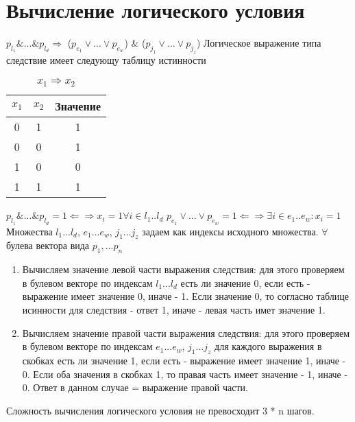 \documentclass[a4paper,12pt]{article}
\begin{document}
\section{Вычисление логического условия}
${p_{l_1} \& ...\& p_{l_d}} \Rightarrow$ (${p_{e_1}\vee ... \vee p_{e_w}}$) $ \& $ (${p_{j_1}\vee ...\vee p_{j_z}}$)
\newline Логическое выражение типа следствие имеет следующу таблицу истинности
\begin{table}[h]
	\caption{$x_1 \Rightarrow x_2$}
	\begin{center}
		\begin{tabular}{|c|c|c|}
			\hline
			$x_1$ & $x_2$ & Значение \\
			\hline
			0 & 1 & 1 \\
			\hline
			0 & 0 & 1 \\
			\hline
			1 & 0 & 0 \\
			\hline
			1 & 1 & 1 \\
			\hline
		\end{tabular}
	\end{center}
\end{table}
\newline ${p_{l_1} \& ...\& p_{l_d}} = 1 \Leftarrow \Rightarrow x_i = 1  \forall i \in {l_1..l_d}$
\newline ${p_{e_1} \vee ...\vee p_{e_w}} = 1 \Leftarrow \Rightarrow \exists i \in {e_1..e_w}: x_i = 1$
\newline Множества ${{l_1}...{l_d}}$, ${{e_1}...{e_w}}$, ${{j_1}...{j_z}}$ задаем как индексы исходного множества.
$\forall $ булева вектора вида $ {p_{1},...p_{n}}$
\begin{enumerate}
\item 
Вычисляем значение левой части выражения следствия: для этого проверяем в булевом векторе по индексам ${{l_1}...{l_d}}$ есть ли значение 0, если есть - выражение имеет значение 0, иначе - 1. Если значение 0, то согласно таблице исинности для следствия - ответ 1, иначе - левая часть имет значение 1.
\item 
Вычисляем значение правой части выражения следствия: для этого проверяем в булевом векторе по индексам ${{{e_1}...{e_w}}}$, ${{j_1}...{j_z}}$ для каждого выражения в скобках есть ли значение 1, если есть - выражение имеет значение 1, иначе - 0. Если оба значения в скобках 1, то правая часть имеет значение - 1, иначе - 0. Ответ в данном случае = выражение правой части.
\end{enumerate}
Сложность вычисления логического условия не превосходит 3 * n шагов.
\end{document}
